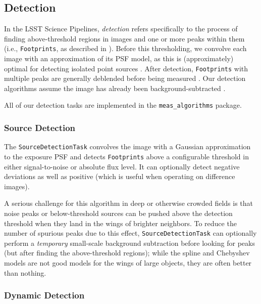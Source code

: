 \subsection{Detection}
\label{sec:detection}

In the LSST Science Pipelines, \emph{detection} refers specifically to the process of finding above-threshold regions in images and one or more peaks within them (i.e., \texttt{Footprints}, as described in ).
Before this thresholding, we convolve each image with an approximation of its PSF model, as this is (approximately) optimal for detecting isolated point sources \citep{2018PASJ...70S...5B}.
After detection, \texttt{Footprints} with multiple peaks are generally deblended  before being measured .
Our detection algorithms assume the image has already been background-subtracted .

All of our detection tasks are implemented in the \texttt{meas\_algorithms} package.

\subsubsection{Source Detection}
\label{sec:SourceDetectionTask}

The \texttt{SourceDetectionTask} convolves the image with a Gaussian approximation to the exposure PSF and detects \texttt{Footprints} above a configurable threshold in either signal-to-noise or absolute flux level.
It can optionally detect negative deviations as well as positive (which is useful when operating on difference images).

A serious challenge for this algorithm in deep or otherwise crowded fields is that noise peaks or below-threshold sources can be pushed above the detection threshold when they land in the wings of brighter neighbors.
To reduce the number of spurious peaks due to this effect, \texttt{SourceDetectionTask} can optionally perform a \emph{temporary} small-scale background subtraction before looking for peaks (but after finding the above-threshold regions); while the spline and Chebyshev models are not good models for the wings of large objects, they are often better than nothing.

\subsubsection{Dynamic Detection}
\label{sec:DynamicDetectionTask}

